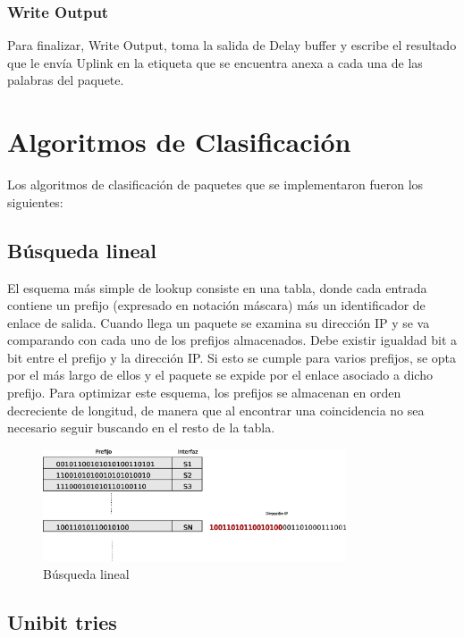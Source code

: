 \subsubsection{Write Output}
Para finalizar, Write Output, toma la salida de Delay buffer y escribe el resultado que le envía Uplink en la etiqueta que se encuentra anexa a cada una de las palabras del paquete.

\section{Algoritmos de Clasificación}

Los algoritmos de clasificación de paquetes que se implementaron fueron los siguientes:

\subsection{Búsqueda lineal}

El esquema más simple de lookup consiste en una tabla, donde cada entrada contiene un prefijo (expresado en notación máscara) más un identificador de enlace de salida. Cuando llega un paquete se examina su dirección IP y se va comparando con cada uno de los prefijos almacenados. Debe existir igualdad bit a bit entre el prefijo y la dirección IP. Si esto se cumple para varios prefijos, se opta por el más largo de ellos y el paquete se expide por el enlace asociado a dicho prefijo.
Para optimizar este esquema, los prefijos se almacenan en orden decreciente de longitud, de manera que al encontrar una coincidencia no sea necesario seguir buscando en el resto de la tabla.

\begin{figure}[h]
  \centering
	\includegraphics[width=0.80\textwidth]{2-sistema/graf/linear.eps}
  \caption{Búsqueda lineal}
  \label{fig:linear}
\end{figure}

\subsection {Unibit tries}


